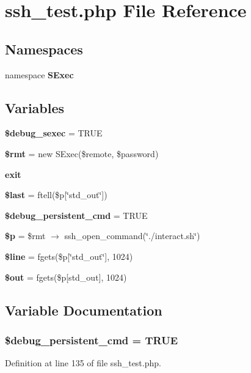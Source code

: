 \section{ssh\_\-test.php File Reference}
\label{ssh__test_8php}
\subsection*{Namespaces}
\begin{CompactItemize}
\item 
namespace {\bf SExec}
\end{CompactItemize}
\subsection*{Variables}
\begin{CompactItemize}
\item 
{\bf \$debug\_\-sexec} = TRUE
\item 
{\bf \$rmt} = new SExec(\$remote, \$password)
\item 
{\bf exit}
\item 
{\bf \$last} = ftell(\$p[\char`\"{}std\_\-out\char`\"{}])
\item 
{\bf \$debug\_\-persistent\_\-cmd} = TRUE
\item 
{\bf \$p} = \$rmt $\rightarrow$ ssh\_\-open\_\-command(\char`\"{}./interact.sh\char`\"{})
\item 
{\bf \$line} = fgets(\$p[\char`\"{}std\_\-out\char`\"{}], 1024)
\item 
{\bf \$out} = fgets(\$p[std\_\-out], 1024)
\end{CompactItemize}


\subsection{Variable Documentation}
\subsubsection{\setlength{\rightskip}{0pt plus 5cm}\$debug\_\-persistent\_\-cmd = TRUE}\label{ssh__test_8php_a4}




Definition at line 135 of file ssh\_\-test.php.
